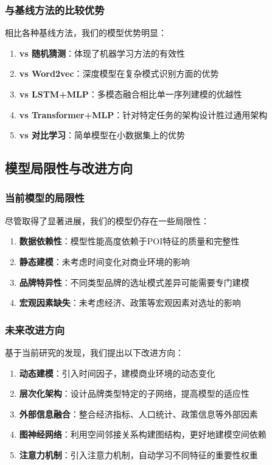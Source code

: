 \documentclass{article}
\begin{document}
\subsubsection{与基线方法的比较优势}

相比各种基线方法，我们的模型优势明显：

\begin{enumerate}
\item \textbf{vs 随机猜测}：体现了机器学习方法的有效性
\item \textbf{vs Word2vec}：深度模型在复杂模式识别方面的优势
\item \textbf{vs LSTM+MLP}：多模态融合相比单一序列建模的优越性
\item \textbf{vs Transformer+MLP}：针对特定任务的架构设计胜过通用架构
\item \textbf{vs 对比学习}：简单模型在小数据集上的优势
\end{enumerate}

\subsection{模型局限性与改进方向}

\subsubsection{当前模型的局限性}

尽管取得了显著进展，我们的模型仍存在一些局限性：

\begin{enumerate}
\item \textbf{数据依赖性}：模型性能高度依赖于POI特征的质量和完整性
\item \textbf{静态建模}：未考虑时间变化对商业环境的影响
\item \textbf{品牌特异性}：不同类型品牌的选址模式差异可能需要专门建模
\item \textbf{宏观因素缺失}：未考虑经济、政策等宏观因素对选址的影响
\end{enumerate}

\subsubsection{未来改进方向}

基于当前研究的发现，我们提出以下改进方向：

\begin{enumerate}
\item \textbf{动态建模}：引入时间因子，建模商业环境的动态变化
\item \textbf{层次化架构}：设计品牌类型特定的子网络，提高模型的适应性
\item \textbf{外部信息融合}：整合经济指标、人口统计、政策信息等外部因素
\item \textbf{图神经网络}：利用空间邻接关系构建图结构，更好地建模空间依赖
\item \textbf{注意力机制}：引入注意力机制，自动学习不同特征的重要性权重
\end{enumerate}
\end{document}
